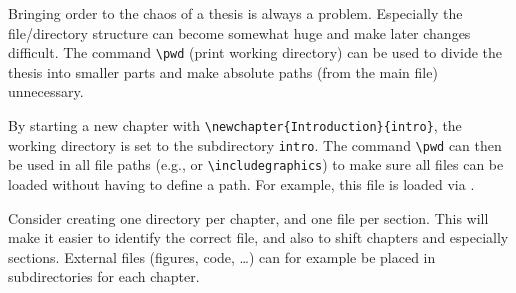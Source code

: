 
Bringing order to the chaos of a thesis is always a problem. Especially the file/directory structure can become somewhat huge and make later changes difficult. The command \verb|\pwd| (print working directory) can be used to divide the thesis into smaller parts and make absolute paths (from the main file) unnecessary.

By starting a new chapter with \verb|\newchapter{Introduction}{intro}|, the working directory is set to the subdirectory \verb|intro|. The command \verb|\pwd| can then be used in all file paths (e.g., \verb|| or \verb|\includegraphics|) to make sure all files can be loaded without having to define a path. For example, this file is loaded via \verb||.

Consider creating one directory per chapter, and one file per section. This will make it easier to identify the correct file, and also to shift chapters and especially sections. External files (figures, code, \dots) can for example be placed in subdirectories for each chapter.






